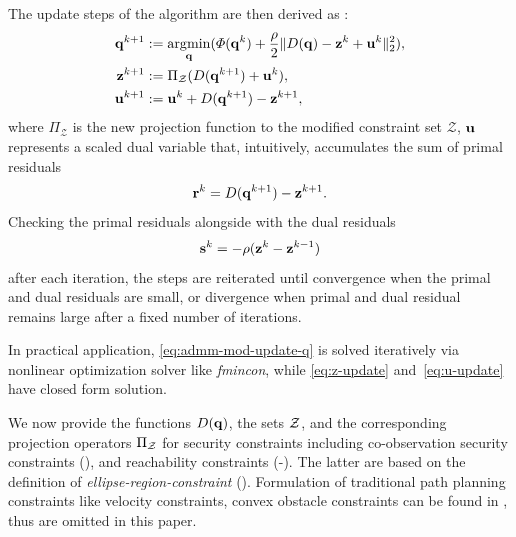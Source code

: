 \documentclass[10pt,twocolumn,twoside]{IEEEtran}
\newcommand{\news}{\color{blue}}
\begin{document}
The update steps of the algorithm are then derived as \cite{Boyd2011}:
\begin{subequations}\label{eq:ADMMupdate}
	\begin{align}
		\mathbf{q}^{k+1}&:=\operatorname*{\arg\!\min}_{\mathbf{q}}(\varPhi(\mathbf{q}^k) +\frac{\rho}{2}\lVert D(\mathbf{q})-\mathbf{z}^k+\mathbf{u}^k\rVert_2^2),\label{eq:admm-mod-update-q}\\
		\mathbf{z}^{k+1}&:=\Pi_\mathcal{Z}(D(\mathbf{q}^{k+1})+\mathbf{u}^k), \label{eq:z-update} \\
		\mathbf{u}^{k+1}&:=\mathbf{u}^k+D(\mathbf{q}^{k+1})-\mathbf{z}^{k+1}, \label{eq:u-update}
	\end{align}
\end{subequations}
where $\Pi_\mathcal{Z}$ is the new projection function to the modified constraint set $\mathcal{Z}$, $\mathbf{u}$ represents a scaled dual variable that, intuitively, accumulates the sum of primal residuals
\begin{equation}\label{eq:primal-residual}
	\mathbf{r}^{k}=D(\mathbf{q}^{k+1})-\mathbf{z}^{k+1}.
\end{equation}
Checking the primal residuals alongside with the dual residuals 
\begin{equation}\label{eq:dual-residual}
	\mathbf{s}^{k}=-\rho(\mathbf{z}^{k}-\mathbf{z}^{k-1})
\end{equation}
after each iteration, the steps are reiterated until convergence when the primal and dual residuals are small, or divergence when primal and dual residual remains large after a fixed number of iterations.
{\news
\begin{remark}
In practical application, \eqref{eq:admm-mod-update-q} is solved iteratively via nonlinear optimization solver like \emph{fmincon}, while \eqref{eq:z-update} and~\eqref{eq:u-update} have closed form solution.
\end{remark}
}

We now provide the functions $D(\mathbf{q})$, the sets $\mathcal{Z}$, and the corresponding projection operators $\Pi_{\mathcal{Z}}$ for security constraints including co-observation security constraints (), and reachability constraints (-). The latter are based on the definition of \emph{ellipse-region-constraint} ().
Formulation of traditional path planning constraints like velocity constraints, convex obstacle constraints can be found in \cite{yang2020multi}, thus are omitted in this paper.
\end{document}
